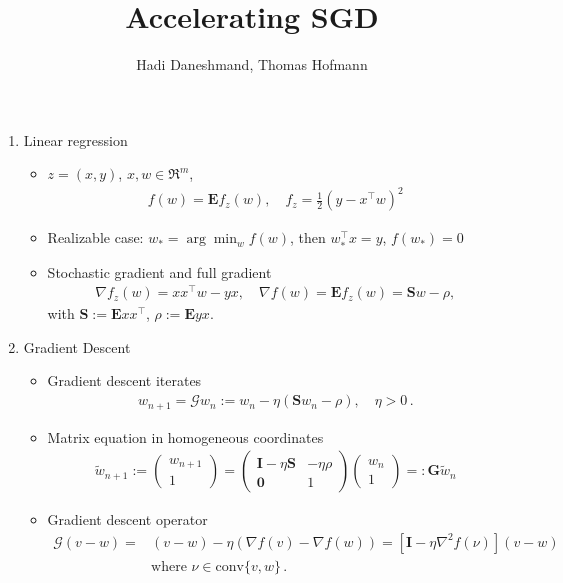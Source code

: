 \documentclass{article}
\author{Hadi Daneshmand, Thomas Hofmann}
\title{Accelerating SGD}
\newcommand{\E}{{\mathbf E}}
\newcommand{\mI}{{\mathbf I}}
\newcommand{\mS}{{\mathbf S}}
\newcommand{\is}[1]{\setlength{\itemsep}{#1}}
\begin{document}
\maketitle 
\begin{enumerate} \is{4mm}
\item Linear regression
\begin{itemize} \is{2mm}
\item $z=(x,y)$, $x,w\in \Re^m$,
\begin{align}
f(w) = \E f_{z}(w), \quad f_{z} = \frac 12 (y - x^\top w)^2
\end{align}
\item Realizable case: $w_* = \arg\min_w f(w)$, then $w^\top_* x = y$, $f(w_*)=0$ 
\item Stochastic gradient and full gradient 
\begin{align}
\nabla f_{z}(w) = x x^\top w - y x, \quad \nabla f(w)= \E f_z(w) =  \mS w - \rho,
\end{align}
with $\mS:=\E xx^\top$, $\rho := \E yx$. 
\end{itemize}
\item Gradient Descent 
\begin{itemize}  \is{2mm}
\item Gradient descent iterates 
\begin{align}
w_{n+1} = \mathcal G w_n := w_n - \eta (\mS w_n -\rho), \quad \eta >0\,.
\end{align}
\item Matrix equation in homogeneous coordinates
\begin{align}
\tilde w_{n+1} := \begin{pmatrix} w_{n+1} \\ 1 \end{pmatrix} 
=  
\begin{pmatrix} \mI - \eta \mS & - \eta \rho  \\   \mathbf 0 & 1 \end{pmatrix} 
\begin{pmatrix} w_{n} \\ 1 \end{pmatrix} 
= : 
\mathbf G \tilde w_n 
\end{align}
\item Gradient descent operator 
\begin{align}
\mathcal G (v- w) = & (v -w) - \eta (\nabla f(v) - \nabla f(w)) = \left[ \mI - \eta \nabla^2 f(\nu) \right]  (v-w) \nonumber \\
& \text{where $\nu \in \text{conv}\{v,w\}$}\,.
\end{align}

\end{itemize}
\end{enumerate}
\end{document}
